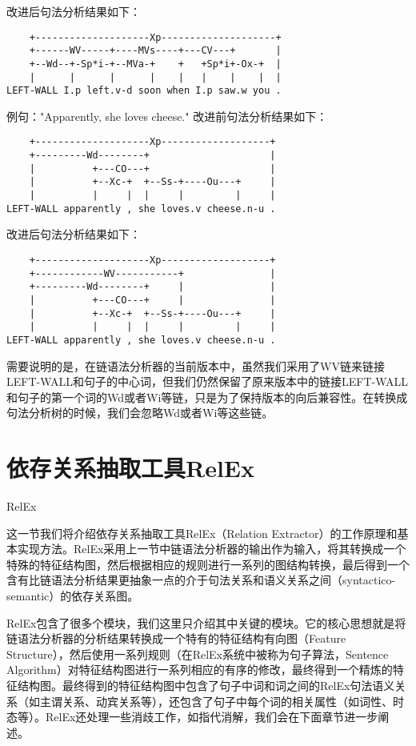 改进后句法分析结果如下：
\begin{verbatim}
    +--------------------Xp--------------------+
    +------WV-----+----MVs----+---CV---+       |
    +--Wd--+-Sp*i-+--MVa-+    +   +Sp*i+-Ox-+  |
    |      |      |      |    |   |    |    |  |
LEFT-WALL I.p left.v-d soon when I.p saw.w you .
\end{verbatim}

例句："Apparently, she loves cheese."
改进前句法分析结果如下：
\begin{verbatim}
    +--------------------Xp-------------------+
    +---------Wd--------+                     |
    |          +---CO---+                     |
    |          +--Xc-+  +--Ss-+----Ou---+     |
    |          |     |  |     |         |     |
LEFT-WALL apparently , she loves.v cheese.n-u .
\end{verbatim}

改进后句法分析结果如下：

\begin{verbatim}
    +--------------------Xp-------------------+
    +------------WV-----------+               |
    +---------Wd--------+     |               |
    |          +---CO---+     |               |
    |          +--Xc-+  +--Ss-+----Ou---+     |
    |          |     |  |     |         |     |
LEFT-WALL apparently , she loves.v cheese.n-u .
\end{verbatim}

需要说明的是，在链语法分析器的当前版本中，虽然我们采用了WV链来链接LEFT-WALL和句子的中心词，但我们仍然保留了原来版本中的链接LEFT-WALL和句子的第一个词的Wd或者Wi等链，只是为了保持版本的向后兼容性。在转换成句法分析树的时候，我们会忽略Wd或者Wi等这些链。

\section{依存关系抽取工具RelEx}{RelEx}

这一节我们将介绍依存关系抽取工具RelEx（Relation Extractor）的工作原理和基本实现方法。RelEx采用上一节中链语法分析器的输出作为输入，将其转换成一个特殊的特征结构图，然后根据相应的规则进行一系列的图结构转换，最后得到一个含有比链语法分析结果更抽象一点的介于句法关系和语义关系之间（syntactico-semantic）的依存关系图。

RelEx包含了很多个模块，我们这里只介绍其中关键的模块。它的核心思想就是将链语法分析器的分析结果转换成一个特有的特征结构有向图（Feature Structure），然后使用一系列规则（在RelEx系统中被称为句子算法，Sentence Algorithm）对特征结构图进行一系列相应的有序的修改，最终得到一个精炼的特征结构图。最终得到的特征结构图中包含了句子中词和词之间的RelEx句法语义关系（如主谓关系、动宾关系等），还包含了句子中每个词的相关属性（如词性、时态等）。RelEx还处理一些消歧工作，如指代消解，我们会在下面章节进一步阐述。

